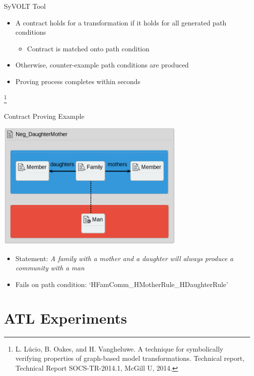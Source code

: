 \documentclass[12pt, handout]{beamer}
\newcommand\blfootnote[1]{%
  \begingroup
  \renewcommand\thefootnote{}\footnote{#1}%
  \addtocounter{footnote}{-1}%
  \endgroup
}
\begin{document}
\begin{frame}{SyVOLT Tool}
\begin{itemize}[<+->]
\item A contract holds for a transformation if it holds for all generated path conditions
\begin{itemize}
\item Contract is matched onto path condition
\end{itemize}
\item Otherwise, counter-example path conditions are produced
\item Proving process completes within seconds
\end{itemize}
\blfootnote{L. Lúcio, B. Oakes, and H. Vangheluwe. A technique for symbolically verifying properties of graph-based model transformations. Technical report, Technical Report SOCS-TR-2014.1, McGill U, 2014.}
\end{frame}

\begin{frame}{Contract Proving Example}
\begin{center}
\includegraphics[width=0.7\textwidth]{figures/Pos_DaughterMother}
\end{center}
\begin{itemize}[<+->]
\item Statement: \textit{A family with a mother and a daughter will always produce a community with a man}
\item Fails on path condition: `HFamComm\_HMotherRule\_HDaughterRule'
\end{itemize}
\end{frame}

\section{ATL Experiments}
\end{document}
